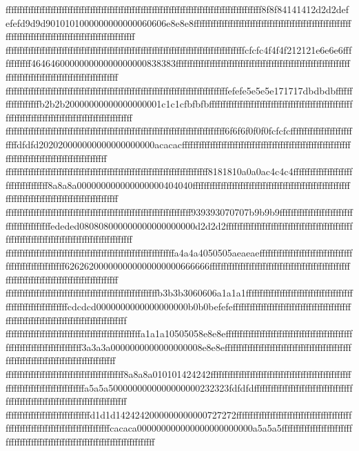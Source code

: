 {{{fffffffffffffffffffffffffffffffffffffffffffffffffffffffffffffffffffffffffffffffffffffffffff8f8f84141412d2d2defefefd9d9d9010101000000000000060606e8e8e8ffffffffffffffffffffffffffffffffffffffffffffffffffffffffffffffffffffffffffffffffffffffffffffffffffffff
fffffffffffffffffffffffffffffffffffffffffffffffffffffffffffffffffffffffffffffffffffffcfcfc4f4f4f212121e6e6e6ffffffffffff464646000000000000000000838383ffffffffffffffffffffffffffffffffffffffffffffffffffffffffffffffffffffffffffffffffffffffffffffffffffffff
fffffffffffffffffffffffffffffffffffffffffffffffffffffffffffffffffffffffffffffffefefe5e5e5e171717dbdbdbffffffffffffffffffb2b2b20000000000000000001c1c1cfbfbfbffffffffffffffffffffffffffffffffffffffffffffffffffffffffffffffffffffffffffffffffffffffffffffffff
ffffffffffffffffffffffffffffffffffffffffffffffffffffffffffffffffffffffffffffff6f6f6f0f0f0fcfcfcffffffffffffffffffffffffffdfdfd202020000000000000000000acacacffffffffffffffffffffffffffffffffffffffffffffffffffffffffffffffffffffffffffffffffffffffffffffffff
ffffffffffffffffffffffffffffffffffffffffffffffffffffffffffffffffffffffff8181810a0a0ac4c4c4ffffffffffffffffffffffffffffffffffff8a8a8a000000000000000000404040ffffffffffffffffffffffffffffffffffffffffffffffffffffffffffffffffffffffffffffffffffffffffffffffff
ffffffffffffffffffffffffffffffffffffffffffffffffffffffffffffffffff939393070707b9b9b9ffffffffffffffffffffffffffffffffffffffffffededed080808000000000000000000d2d2d2ffffffffffffffffffffffffffffffffffffffffffffffffffffffffffffffffffffffffffffffffffffffffff
ffffffffffffffffffffffffffffffffffffffffffffffffffffffffffffa4a4a4050505aeaeaeffffffffffffffffffffffffffffffffffffffffffffffffffffff626262000000000000000000666666ffffffffffffffffffffffffffffffffffffffffffffffffffffffffffffffffffffffffffffffffffffffffff
ffffffffffffffffffffffffffffffffffffffffffffffffffffffb3b3b3060606a1a1a1ffffffffffffffffffffffffffffffffffffffffffffffffffffffffffffcdcdcd0000000000000000000b0b0befefefffffffffffffffffffffffffffffffffffffffffffffffffffffffffffffffffffffffffffffffffffff
ffffffffffffffffffffffffffffffffffffffffffffffffa1a1a10505058e8e8effffffffffffffffffffffffffffffffffffffffffffffffffffffffffffffffffffffff3a3a3a0000000000000000008e8e8effffffffffffffffffffffffffffffffffffffffffffffffffffffffffffffffffffffffffffffffffff
ffffffffffffffffffffffffffffffffffffffffff8a8a8a010101424242ffffffffffffffffffffffffffffffffffffffffffffffffffffffffffffffffffffffffffffffa5a5a5000000000000000000232323fdfdfdffffffffffffffffffffffffffffffffffffffffffffffffffffffffffffffffffffffffffffff
ffffffffffffffffffffffffffffffd1d1d1424242000000000000727272ffffffffffffffffffffffffffffffffffffffffffffffffffffffffffffffffffffffffffffffcacaca000000000000000000000000a5a5a5ffffffffffffffffffffffffffffffffffffffffffffffffffffffffffffffffffffffffffffff
}}}
